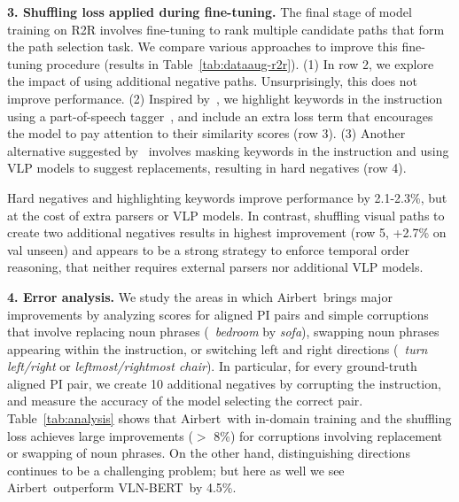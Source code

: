 \RequirePackage[dvipsnames,table]{xcolor} \documentclass[10pt,twocolumn,letterpaper]{article}
\newcommand{\p}[1]{\vspace{1mm}\noindent\textbf{#1}}
\newcommand{\vlnbert}{VLN-BERT}
\newcommand{\airbert}{Airbert}
\begin{document}
\p{3. Shuffling loss applied during fine-tuning.}
The final stage of model training on R2R involves fine-tuning to rank multiple candidate paths that form the path selection task.
We compare various approaches to improve this fine-tuning procedure (results in Table~\ref{tab:dataaug-r2r}).
(1) In row 2, we explore the impact of using additional negative paths.
Unsurprisingly, this does not improve performance.
(2) Inspired by~\cite{gupta2020contrastive}, we highlight keywords in the instruction using a part-of-speech tagger~\cite{joshi2018parser}, and include an extra loss term that encourages the model to pay attention to their similarity scores (row 3).
(3) Another alternative suggested by~\cite{gupta2020contrastive} involves masking keywords in the instruction and using VLP models to suggest replacements, resulting in hard negatives (row 4).

Hard negatives and highlighting keywords improve performance by 2.1-2.3\%, but at the cost of extra parsers or VLP models.
In contrast, shuffling visual paths to create two additional negatives results in highest improvement (row 5, +2.7\% on val unseen) and appears to be a strong strategy to enforce temporal order reasoning, that neither requires external parsers nor additional VLP models.



















\p{4. Error analysis.}
We study the areas in which \airbert~brings major improvements by analyzing scores for aligned PI pairs and simple corruptions that involve replacing noun phrases (\eg~\emph{bedroom} by \emph{sofa}), swapping noun phrases appearing within the instruction, or switching left and right directions (\eg~\emph{turn left/right} or \emph{leftmost/rightmost chair}).
In particular, for every ground-truth aligned PI pair, we create 10 additional negatives by corrupting the instruction, and measure the accuracy of the model selecting the correct pair.
Table~\ref{tab:analysis} shows that \airbert~with in-domain training and the shuffling loss achieves large improvements ($>$ 8\%) for corruptions involving replacement or swapping of noun phrases.
On the other hand, distinguishing directions continues to be a challenging problem; but here as well we see \airbert~outperform \vlnbert~by 4.5\%.
\end{document}
